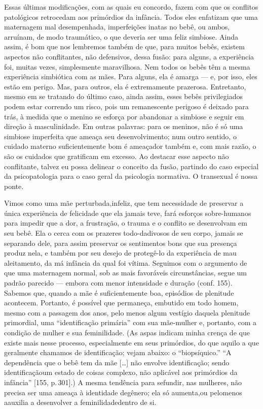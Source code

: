Essas últimas modificações, com as quais eu concordo, fazem com que
os conflitos patológicos retrocedam aos primórdios da infância. Todos
eles enfatizam que uma maternagem mal desempenhada, imperfeições inatas
no bebê, ou ambos, arruínam, de modo traumático, o que deveria ser uma
feliz simbiose. Ainda assim, é bom que nos lembremos também de que,
para muitos bebês, existem aspectos não conflitantes, não defensivos,
dessa fusão: para alguns, a experiência foi, muitas vezes, simplesmente
maravilhosa. Nem todos os bebês têm a mesma experiência simbiótica com
as mães. Para alguns, ela é amarga --- e, por isso, eles estão em
perigo. Mas, para outros, ela é extremamente prazerosa. Entretanto,
mesmo em se tratando do último caso, ainda assim, esses bebês
privilegiados podem estar correndo um risco, pois um remanescente
perigoso é deixado para trás, à medida que o menino se esforça por
abandonar a simbiose e seguir em direção à masculinidade. Em outras
palavras: para os meninos, não é só uma simbiose imperfeita que ameaça
seu desenvolvimento; num outro sentido, o cuidado materno
suficientemente bom é ameaçador também e, com mais razão, o são os
cuidados que gratificam em excesso. Ao destacar esse aspecto não
conflitante, talvez eu possa delinear o conceito da fusão, partindo do
caso especial da psicopatologia para o caso geral da psicologia
normativa. O transexual é nossa ponte.

Vimos como uma mãe perturbada,\idxmaesfilh[|(] infeliz, que tem necessidade de
preservar a única experiência de felicidade que ela jamais teve, fará
esforços sobre-humanos para impedir que a dor, a frustração, o trauma e
o conflito se desenvolvam em seu bebê. Ela o cerca com os prazeres
todo-dadivosos de seu corpo, jamais se separando dele, para assim
preservar os sentimentos bons que sua presença produz nela, e também
por seu desejo de protegê-lo da experiência de mau aleitamento, da má
infância da qual foi vítima. Seguimos com o argumento de que uma
maternagem normal, sob as mais favoráveis circunstâncias, segue um
padrão parecido --- embora com menor intensidade e duração (conf.
155). Sabemos que, quando a mãe é suficientemente boa, episódios de
plenitude acontecem. Portanto, é possível que permaneça, embutido em
todo homem, mesmo com a passagem dos anos, pelo menos algum vestígio
daquela plenitude primordial, uma ``identificação
primária'' com sua mãe-mulher\idxmaesiden{} e, portanto, com a condição
de mulher e sua feminilidade.\idxmaesdese{} (As aspas indicam minha crença de que
existe mais nesse processo, especialmente em seus primórdios, do que
aquilo a que geralmente chamamos de identificação; vejam abaixo: o
``biopsíquico.'' ``A dependência
que o bebê tem da mãe [\ldots{}] não envolve identificação; sendo identificação\idxtranseetio[|)]
um estado de coisas complexo, não aplicável aos primórdios da
infância'' [155, p.\,301].) A mesma tendência para se\idxtransesimb[|)]
fundir, nas mulheres, não precisa ser uma ameaça à identidade de\idxhomosexpe[|)]
gênero; ela só aumenta,\idxmaestran[|)] ou pelo\idxmascupap[|)] menos a\idxhomoslate[|)] auxilia a desenvolver a
feminilidade\idxmaesfilh[|)] dentro de si.

